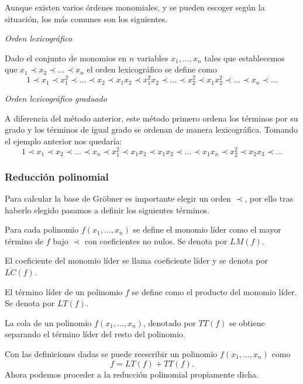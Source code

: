 Aunque existen varios órdenes monomiales, y se pueden escoger según la situación, los más comunes son los siguientes.

\textit{Orden lexicográfico}

Dado el conjunto de monomios en $n$ variables $x_1, \dotso, x_n$ tales que establecemos que $x_1 \prec x_2 \prec \dotso \prec x_n$ el orden lexicográfico se define como
$$1 \prec x_1 \prec x_1^2 \prec \dotso \prec x_2 \prec x_1 x_2 \prec x_1^2 x_2 \prec \dotso \prec x_2^2 \prec x_1x_2^2 \prec \dotso \prec x_n \prec \dotso $$

\textit{Orden lexicográfico graduado}

A diferencia del método anterior, este método primero ordena los términos por su grado y los términos de igual grado se ordenan de manera lexicográfica. Tomando el ejemplo anterior nos quedaría:
$$1 \prec x_1 \prec x_2 \prec \dotso \prec x_n \prec x_1^2 \prec x_1 x_2 \prec x_1x_2 \prec \dotso\prec x_1x_n \prec x_2^2 \prec x_2x_3 \prec \dotso$$

\subsubsection*{Reducción polinomial}

Para calcular la base de Gröbner es importante elegir un orden $\prec$, por ello tras haberlo elegido pasamos a definir los siguientes términos.

\begin{definition}
Para cada polinomio $f(x_1, \dotso, x_n)$ se define el monomio líder como el mayor término de $f$ bajo $\prec$ con coeficientes no nulos. Se denota por $LM(f)$.
\end{definition}

\begin{remark}
El coeficiente del monomio líder se llama coeficiente líder y se denota por $LC(f)$.
\end{remark}

\begin{definition}
El término líder de un polinomio $f$ se define como el producto del monomio líder. Se denota por $LT(f)$.
\end{definition}

\begin{definition}
La cola de un polinomio $f(x_1, \dotso, x_n)$, denotado por $TT(f)$ se obtiene separando el término líder del resto del polinomio.
\end{definition}

Con las definiciones dadas se puede reescribir un polinomio $f(x_1, \dotso, x_n)$ como
$$f = LT(f) + TT(f).$$
Ahora podemos proceder a la reducción polinomial propiamente dicha.

